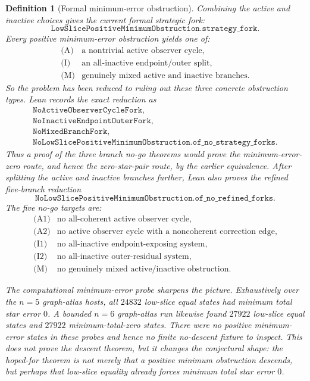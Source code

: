 \documentclass[11pt]{article}
\newtheorem{definition}{Definition}
\begin{document}
\begin{definition}[Formal minimum-error obstruction]
Combining the active and inactive choices gives the current formal strategic
fork:
\[
  \texttt{LowSlicePositiveMinimumObstruction.strategy\_fork}.
\]
Every positive minimum-error obstruction yields one of:
\[
\begin{array}{ll}
\text{(A)} & \text{a nontrivial active observer cycle},\\
\text{(I)} & \text{an all-inactive endpoint/outer split},\\
\text{(M)} & \text{genuinely mixed active and inactive branches}.
\end{array}
\]
So the problem has been reduced to ruling out these three concrete obstruction
types.  Lean records the exact reduction as
\[
\begin{array}{l}
\texttt{NoActiveObserverCycleFork},\\
\texttt{NoInactiveEndpointOuterFork},\\
\texttt{NoMixedBranchFork},\\
\texttt{NoLowSlicePositiveMinimumObstruction.of\_no\_strategy\_forks}.
\end{array}
\]
Thus a proof of the three branch no-go theorems would prove the
minimum-error-zero route, and hence the zero-star-pair route, by the earlier
equivalence.
After splitting the active and inactive branches further, Lean also proves the
refined five-branch reduction
\[
  \texttt{NoLowSlicePositiveMinimumObstruction.of\_no\_refined\_forks}.
\]
The five no-go targets are:
\[
\begin{array}{ll}
\text{(A1)} & \text{no all-coherent active observer cycle},\\
\text{(A2)} & \text{no active observer cycle with a noncoherent correction edge},\\
\text{(I1)} & \text{no all-inactive endpoint-exposing system},\\
\text{(I2)} & \text{no all-inactive outer-residual system},\\
\text{(M)} & \text{no genuinely mixed active/inactive obstruction}.
\end{array}
\]

The computational minimum-error probe sharpens the picture.  Exhaustively over
the \(n=5\) graph-atlas hosts, all \(24832\) low-slice equal states had minimum
total star error \(0\).  A bounded \(n=6\) graph-atlas run likewise found
\(27922\) low-slice equal states and \(27922\) minimum-total-zero states.  There
were no positive minimum-error states in these probes and hence no finite
no-descent fixture to inspect.  This does not prove the descent theorem, but it
changes the conjectural shape: the hoped-for theorem is not merely that a
positive minimum obstruction descends, but perhaps that low-slice equality
already forces minimum total star error \(0\).


\end{definition}
\end{document}
